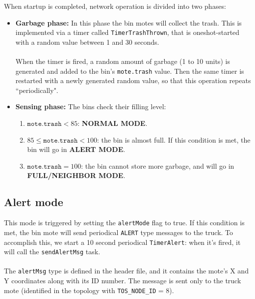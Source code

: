 \documentclass[]{article}
\begin{document}
\noindent When startup is completed, network operation is divided into two phases:
\begin{itemize}
	\item \textbf{Garbage phase:} In this phase the bin motes will collect the trash. This is implemented via a timer called \texttt{TimerTrashThrown}, that is oneshot-started with a random value between 1 and 30 seconds.\\\\ When the timer is fired, a random amount of garbage (1 to 10 units) is generated and added to the bin's \texttt{mote.trash} value. Then the same timer is restarted with a newly generated random value, so that this operation repeats ``periodically".
	\item \textbf{Sensing phase:} The bins check their filling level:
	\begin{enumerate}
		\item $\texttt{mote.trash} < 85$: \textbf{NORMAL MODE}.  
		\item $85 \leq \texttt{mote.trash} < 100$: the bin is almost full. If this condition is met, the bin will go in \textbf{ALERT MODE}.
		\item $\texttt{mote.trash} = 100$: the bin cannot store more garbage, and will go in \textbf{FULL/NEIGHBOR MODE}.
	\end{enumerate}
\end{itemize}
\subsection{Alert mode}
This mode is triggered by setting the \texttt{alertMode} flag to true. If this condition is met, the bin mote will send periodical \texttt{ALERT} type messages to the truck. To accomplish this, we start a 10 second periodical \texttt{TimerAlert}: when it's fired, it will call the \texttt{sendAlertMsg} task. \\\\
The \texttt{alertMsg} type is defined in the header file, and it contains the mote's X and Y coordinates along with its ID number. The message is sent only to the truck mote (identified in the topology with \texttt{TOS\_NODE\_ID} = 8).
\end{document}
